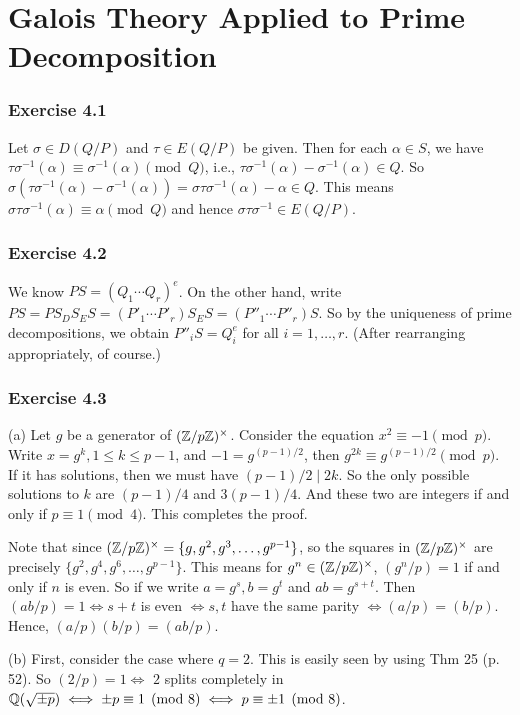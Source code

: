 \documentclass[../Marcus.tex]{subfiles}
\begin{document}
\chapter{Galois Theory Applied to Prime Decomposition}

\subsection*{Exercise 4.1}

Let $\sigma\in D(Q/P)$ and $\tau\in E(Q/P)$ be given. Then for each $\alpha\in S$, we have $\tau\sigma^{-1}(\alpha)\equiv \sigma^{-1}(\alpha) \pmod{Q}$, i.e., $\tau\sigma^{-1}(\alpha)-\sigma^{-1}(\alpha)\in Q$. So $\sigma(\tau\sigma^{-1}(\alpha)-\sigma^{-1}(\alpha))=\sigma\tau\sigma^{-1}(\alpha)-\alpha \in Q$. This means $\sigma\tau\sigma^{-1}(\alpha) \equiv \alpha \pmod{Q}$ and hence $\sigma\tau\sigma^{-1}\in E(Q/P)$.

\subsection*{Exercise 4.2}

We know $PS=(Q_1\cdots Q_r)^e$. On the other hand, write $PS=PS_DS_ES=(P'_1\cdots P'_r)S_ES=(P''_1\cdots P''_r)S$. So by the uniqueness of prime decompositions, we obtain $P''_iS=Q_i^e$ for all $i=1,\ldots,r$. (After rearranging appropriately, of course.)

\subsection*{Exercise 4.3}

(a) Let $g$ be a generator of $(\mathbb{Z}/p\mathbb{Z})^\times$. Consider the equation $x^2\equiv -1\pmod{p}$. Write $x=g^k,1\leq k\leq p-1$, and $-1=g^{(p-1)/2}$, then $g^{2k}\equiv g^{(p-1)/2}\pmod{p}$. If it has solutions, then we must have $(p-1)/2\mid 2k$. So the only possible solutions to $k$ are $(p-1)/4$ and $3(p-1)/4$. And these two are integers if and only if $p\equiv 1\pmod{4}$. This completes the proof.

Note that since $(\mathbb{Z}/p\mathbb{Z})^\times=\{g,g^2,g^3,\ldots,g^{p-1}\}$, so the squares in $(\mathbb{Z}/p\mathbb{Z})^\times$ are precisely $\{g^2,g^4,g^6,\ldots,g^{p-1}\}$. This means for $g^n\in(\mathbb{Z}/p\mathbb{Z})^\times$, $(g^n/p)=1$ if and only if $n$ is even. So if we write $a=g^s,b=g^t$ and $ab=g^{s+t}$. Then $(ab/p)=1 \iff s+t$ is even $\iff s,t$ have the same parity $\iff (a/p)=(b/p)$. Hence, $(a/p)(b/p)=(ab/p)$.

(b) First, consider the case where $q=2$. This is easily seen by using Thm 25 (p. 52). So $(2/p)=1 \iff$ $2$ splits completely in $\mathbb{Q}(\sqrt{\pm p}) \iff \pm p\equiv 1 \pmod{8} \iff p\equiv \pm1 \pmod{8}$.
\end{document}
